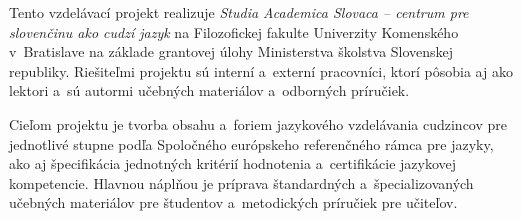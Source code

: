 Tento vzdelávací projekt realizuje \emph{Studia Academica Slovaca – centrum pre slovenčinu ako cudzí jazyk} na Filozofickej fakulte Univerzity Komenského v~Bratislave na základe grantovej úlohy Ministerstva školstva Slovenskej republiky. Riešiteľmi projektu sú interní a~externí pracovníci, ktorí pôsobia aj ako lektori a~sú autormi učebných materiálov a~odborných príručiek.

Cieľom projektu je tvorba obsahu a~foriem jazykového vzdelávania cudzincov pre jednotlivé stupne podľa Spoločného európskeho referenčného rámca pre jazyky, ako aj špecifikácia jednotných kritérií hodnotenia a~certifikácie jazykovej kompetencie. Hlavnou náplňou je príprava štandardných a~špecializovaných učebných materiálov pre študentov a~metodických príručiek pre učiteľov.
